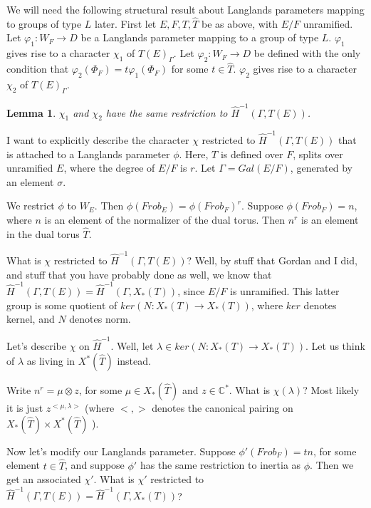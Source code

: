 \documentclass[11pt]{amsart}
\theoremstyle{plain}
\newtheorem{lemma}[enumi]{Lemma}
\begin{document}
We will need the following structural result about Langlands parameters mapping to groups of type $L$ later.  First let $E,F,T, \hat{T}$ be as above, with $E/F$ unramified.  Let $\varphi_1 : W_F \rightarrow D$ be a Langlands parameter mapping to a group of type $L$.  $\varphi_1$ gives rise to a character $\chi_1$ of $T(E)_{\Gamma}$.  Let $\varphi_2 : W_F \rightarrow D$ be defined with the only condition that $\varphi_2(\Phi_F) = t \varphi_1(\Phi_F)$ for some $t \in \hat{T}$.  $\varphi_2$ gives rise to a character $\chi_2$ of $T(E)_{\Gamma}$.

\begin{lemma}\label{toralmodification}
$\chi_1$ and $\chi_2$ have the same restriction to $\hat{H}^{-1}(\Gamma, T(E))$.
\end{lemma}

\proof
I want to explicitly describe the character $\chi$ restricted to $\hat{H}^{-1}(\Gamma, T(E))$ that is attached to a Langlands parameter $\phi$.  Here, $T$ is defined over $F$, splits over unramified $E$, where the degree of $E/F$ is $r$.  Let $\Gamma = Gal(E/F)$, generated by an element $\sigma$.

We restrict $\phi$ to $W_E$.  Then $\phi(Frob_E) = \phi(Frob_F)^r$.  Suppose $\phi(Frob_F) = n$, where $n$ is an element of the normalizer of the dual torus.  Then $n^r$ is an element in the dual torus $\hat{T}$.

What is $\chi$ restricted to $\hat{H}^{-1}(\Gamma, T(E))$?  Well, by stuff that Gordan and I did, and stuff that you have probably done as well, we know that $\hat{H}^{-1}(\Gamma, T(E)) = \hat{H}^{-1}(\Gamma, X_*(T))$, since $E/F$ is unramified.  This latter group is some quotient of $ker(N : X_*(T) \rightarrow X_*(T))$, where $ker$ denotes kernel, and $N$ denotes norm.

Let's describe $\chi$ on $\hat{H}^{-1}$.  Well, let $\lambda \in ker(N : X_*(T) \rightarrow X_*(T))$.  Let us think of $\lambda$ as living in $X^*(\hat{T})$ instead.

Write $n^r = \mu \otimes z$, for some $\mu \in X_*(\hat{T})$ and $z \in \mathbb{C}^*$.  What is $\chi(\lambda)$?  Most likely it is just $z^{<\mu, \lambda>}$  (where $< , >$ denotes the canonical pairing on $X_*(\hat{T}) \times X^*(\hat{T})$ ).

Now let's modify our Langlands parameter.  Suppose $\phi'(Frob_F) = tn$, for some element $t \in \hat{T}$, and suppose $\phi'$ has the same restriction to inertia as $\phi$.  Then we get an associated $\chi'$.  What is $\chi'$ restricted to $\hat{H}^{-1}(\Gamma, T(E)) = \hat{H}^{-1}(\Gamma, X_*(T))$?
\end{document}
